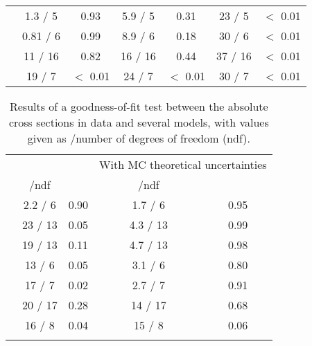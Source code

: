 \begin{table}
{\begin{tabular}{ccccccc}
		\vspace*{0.02cm} \ptmiss &	1.3 / 5 &	 0.93 &	5.9 / 5 &	 0.31 &	23 / 5 &	 $<$ 0.01 \\
		\vspace*{0.02cm} \WPT &	0.81 / 6 &	 0.99 &	8.9 / 6 &	 0.18 &	30 / 6 &	 $<$ 0.01 \\
		\vspace*{0.02cm} \LPT &	11 / 16 &	 0.82 &	16 / 16 &	 0.44 &	37 / 16 &	 $<$ 0.01 \\
		\vspace*{0.02cm} \LETA &	19 / 7 &	 $<$ 0.01 &	24 / 7 &	 $<$ 0.01 &	30 / 7 &	 $<$ 0.01 \\
	\end{tabular}%
	}
\end{table}


\begin{table}
	\centering
	\caption{Results of a goodness-of-fit test between the absolute cross sections in data and several models, with values given as \chis/number of degrees of freedom (ndf).}
	\label{tb:Chi2_absolute}
	\begin{tabular}{ccccc}
		&	 \multicolumn{2}{c}{\powhegpythia} & 	 \multicolumn{2}{c}{With MC theoretical uncertainties} \\ 
		\vspace*{0.02cm} &	\chis/ndf & \pvalue &	\chis/ndf & \pvalue \\ \hline
		\vspace*{0.02cm} \NJET &	2.2 / 6 &	 0.90 &	1.7 / 6 &	 0.95 \\
		\vspace*{0.02cm} \HT &	23 / 13 &	 0.05 &	4.3 / 13 &	 0.99 \\
		\vspace*{0.02cm} \ST &	19 / 13 &	 0.11 &	4.7 / 13 &	 0.98 \\
		\vspace*{0.02cm} \ptmiss &	13 / 6 &	 0.05 &	3.1 / 6 &	 0.80 \\
		\vspace*{0.02cm} \WPT &	17 / 7 &	 0.02 &	2.7 / 7 &	 0.91 \\
		\vspace*{0.02cm} \LPT &	20 / 17 &	 0.28 &	14 / 17 &	 0.68 \\
		\vspace*{0.02cm} \LETA &	16 / 8 &	 0.04 &	15 / 8 &	 0.06 \\
		\vspace*{0.2cm} 
		\newline 
	\end{tabular}

\end{table}
